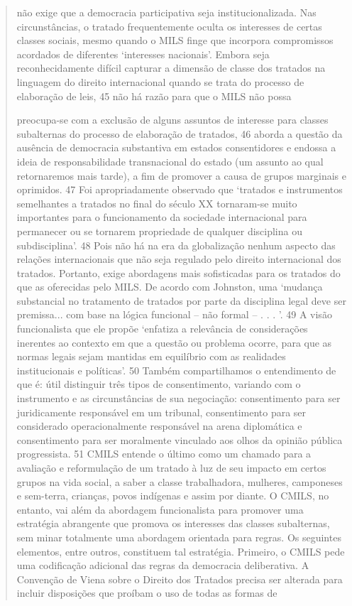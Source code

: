 \documentclass{article}
\begin{document}
\begin{quote}
não exige que a democracia participativa seja institucionalizada. Nas
circunstâncias, o tratado frequentemente oculta os interesses de certas classes
sociais, mesmo quando o MILS finge que incorpora compromissos acordados de
diferentes ‘interesses nacionais’. Embora seja reconhecidamente difícil capturar a
dimensão de classe dos tratados na linguagem do direito internacional quando se trata do processo de elaboração de leis, 45 não há razão para que o MILS não possa

preocupa-se com a exclusão de alguns assuntos de interesse para classes
subalternas do processo de elaboração de tratados, 46 aborda a questão da ausência
de democracia substantiva em estados consentidores e endossa a ideia de
responsabilidade transnacional do estado (um assunto ao qual retornaremos mais tarde),
a fim de promover a causa de grupos marginais e oprimidos. 47
Foi apropriadamente observado que ‘tratados e instrumentos semelhantes a tratados
no final do século XX tornaram-se muito importantes
para o funcionamento da sociedade internacional para permanecer ou se tornarem
propriedade de qualquer disciplina ou subdisciplina’. 48 Pois não há na era
da globalização nenhum aspecto das relações internacionais que não seja regulado pelo direito internacional dos tratados. Portanto, exige abordagens
mais sofisticadas para os tratados do que as oferecidas pelo MILS. De acordo com Johnston, uma ‘mudança substancial no tratamento de tratados por parte da disciplina
legal deve ser premissa... com base na lógica funcional – não formal – . . . ’. 49 A visão funcionalista que ele propõe ‘enfatiza a relevância de
considerações inerentes ao contexto em que a questão ou problema ocorre, para que as normas legais sejam mantidas em equilíbrio com as realidades institucionais e
políticas’. 50 Também compartilhamos o entendimento de que é:
útil distinguir três tipos de consentimento, variando com o instrumento e
as circunstâncias de sua negociação: consentimento para ser juridicamente responsável
em um tribunal, consentimento para ser considerado operacionalmente responsável na arena diplomática e consentimento para ser moralmente vinculado aos olhos da opinião pública progressista. 51
CMILS entende o último como um chamado para a avaliação e reformulação de
um tratado à luz de seu impacto em certos grupos na vida social, a saber
a classe trabalhadora, mulheres, camponeses e sem-terra, crianças, povos indígenas e assim por diante. O CMILS, no entanto, vai além da abordagem funcionalista
para promover uma estratégia abrangente que promova os interesses
das classes subalternas, sem minar totalmente uma abordagem
orientada para regras. Os seguintes elementos, entre outros, constituem tal
estratégia.
Primeiro, o CMILS pede uma codificação adicional das regras da democracia deliberativa. A Convenção de Viena sobre o Direito dos Tratados precisa
ser alterada para incluir disposições que proíbam o uso de todas as formas de


\end{quote}
\end{document}
